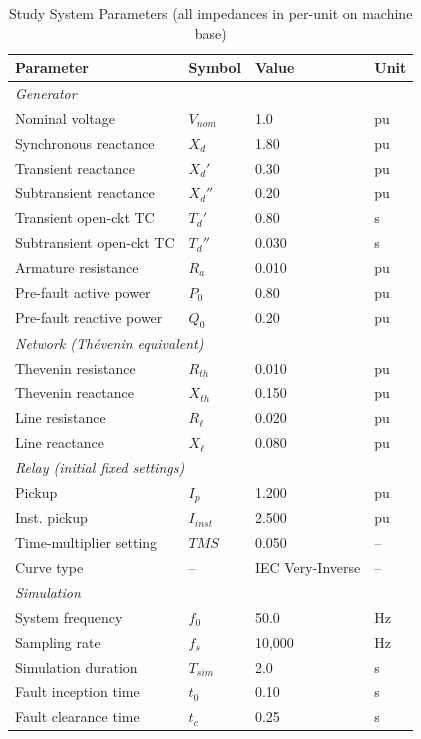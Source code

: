 \documentclass[12pt, a4paper]{article}
\theoremstyle{definition}
\theoremstyle{plain}
\begin{document}
\begin{table}[h]
\centering
\caption{Study System Parameters (all impedances in per-unit on machine base)}
\label{tab:sysparams}
\begin{tabular}{llll}
\toprule
\textbf{Parameter} & \textbf{Symbol} & \textbf{Value} & \textbf{Unit} \\
\midrule
\multicolumn{4}{l}{\textit{Generator}} \\
Nominal voltage         & $V_{nom}$  & 1.0    & pu  \\
Synchronous reactance   & $X_d$      & 1.80   & pu  \\
Transient reactance     & $X_d'$     & 0.30   & pu  \\
Subtransient reactance  & $X_d''$    & 0.20   & pu  \\
Transient open-ckt TC   & $T_d'$     & 0.80   & s   \\
Subtransient open-ckt TC & $T_d''$   & 0.030  & s   \\
Armature resistance     & $R_a$      & 0.010  & pu  \\
Pre-fault active power  & $P_0$      & 0.80   & pu  \\
Pre-fault reactive power & $Q_0$     & 0.20   & pu  \\
\midrule
\multicolumn{4}{l}{\textit{Network (Th\'{e}venin equivalent)}} \\
Thevenin resistance     & $R_{th}$   & 0.010  & pu  \\
Thevenin reactance      & $X_{th}$   & 0.150  & pu  \\
Line resistance         & $R_\ell$   & 0.020  & pu  \\
Line reactance          & $X_\ell$   & 0.080  & pu  \\
\midrule
\multicolumn{4}{l}{\textit{Relay (initial fixed settings)}} \\
Pickup                  & $I_p$      & 1.200  & pu  \\
Inst. pickup            & $I_{inst}$ & 2.500  & pu  \\
Time-multiplier setting & $TMS$      & 0.050  & --  \\
Curve type              & --         & IEC Very-Inverse & -- \\
\midrule
\multicolumn{4}{l}{\textit{Simulation}} \\
System frequency        & $f_0$      & 50.0   & Hz  \\
Sampling rate           & $f_s$      & 10{,}000 & Hz \\
Simulation duration     & $T_{sim}$  & 2.0    & s   \\
Fault inception time    & $t_0$      & 0.10   & s   \\
Fault clearance time    & $t_c$      & 0.25   & s   \\
\bottomrule
\end{tabular}
\end{table}
\end{document}
